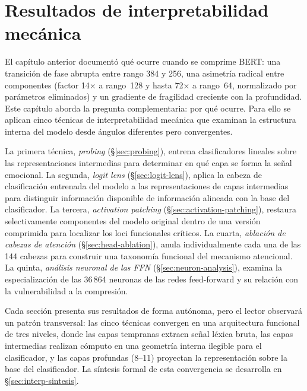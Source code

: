 
\section{Resultados de interpretabilidad mecánica}
\label{sec:resultados-interpretabilidad}

El capítulo anterior documentó qué ocurre cuando se comprime BERT:
una transición de fase abrupta entre rango 384 y 256, una asimetría
radical entre componentes (factor 14$\times$ a rango~128 y hasta
72$\times$ a rango~64, normalizado por parámetros eliminados) y un
gradiente de fragilidad creciente con la profundidad. Este capítulo
aborda la pregunta complementaria: por qué ocurre. Para ello se
aplican cinco técnicas de interpretabilidad mecánica que examinan la
estructura interna del modelo desde ángulos diferentes pero convergentes.

La primera técnica, \emph{probing} (\S\ref{sec:probing}), entrena
clasificadores lineales sobre las representaciones intermedias para
determinar en qué capa se forma la señal emocional. La segunda,
\emph{logit lens} (\S\ref{sec:logit-lens}), aplica la cabeza de
clasificación entrenada del modelo a las representaciones de capas
intermedias para distinguir información disponible de información
alineada con la base del clasificador. La tercera, \emph{activation
patching} (\S\ref{sec:activation-patching}), restaura selectivamente
componentes del modelo original dentro de una versión comprimida para
localizar los loci funcionales críticos. La cuarta, \emph{ablación de
cabezas de atención} (\S\ref{sec:head-ablation}), anula individualmente
cada una de las 144 cabezas para construir una taxonomía funcional del
mecanismo atencional. La quinta, \emph{análisis neuronal de las FFN}
(\S\ref{sec:neuron-analysis}), examina la especialización de las 36\,864
neuronas de las redes feed-forward y su relación con la vulnerabilidad a
la compresión.

Cada sección presenta sus resultados de forma autónoma, pero el lector
observará un patrón transversal: las cinco técnicas convergen en una
arquitectura funcional de tres niveles, donde las capas tempranas extraen
señal léxica bruta, las capas intermedias realizan cómputo en una
geometría interna ilegible para el clasificador, y las capas profundas
(8--11) proyectan la representación sobre la base del clasificador. La
síntesis formal de esta convergencia se desarrolla en
\S\ref{sec:interp-sintesis}.


